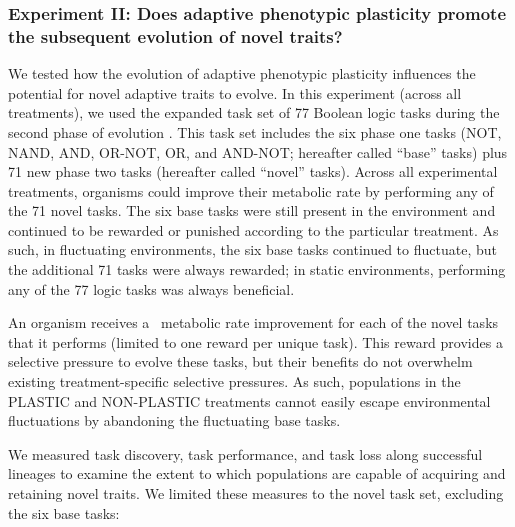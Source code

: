 \vspace{0.5cm}
\subsubsection{Experiment II: Does adaptive phenotypic plasticity promote the subsequent evolution of novel traits?}
\label{sec:methods:experiment-novel-traits}

We tested how the evolution of adaptive phenotypic plasticity influences the potential for novel adaptive traits to evolve.
In this experiment (across all treatments), we used the expanded task set of 77 Boolean logic tasks during the second phase of evolution \citep{ofria_avida:_2009}.
This task set includes the six phase one tasks (NOT, NAND, AND, OR-NOT, OR, and AND-NOT; hereafter called ``base'' tasks) plus 71 new phase two tasks (hereafter called ``novel'' tasks).
Across all experimental treatments, organisms could improve their metabolic rate by performing any of the 71 novel tasks.
The six base tasks were still present in the environment and continued to be rewarded or punished according to the particular treatment.
As such, in fluctuating environments, the six base tasks continued to fluctuate, but the additional 71 tasks were always rewarded; in static environments, performing any of the 77 logic tasks was always beneficial.

An organism receives a \novelTraitsReward\ metabolic rate improvement for each of the novel tasks that it performs (limited to one reward per unique task).
This reward provides a selective pressure to evolve these tasks, but their benefits do not overwhelm existing treatment-specific selective pressures.
As such, populations in the PLASTIC and NON-PLASTIC treatments cannot easily escape environmental fluctuations by abandoning the fluctuating base tasks.

We measured task discovery, task performance, and task loss along successful lineages to examine the extent to which populations are capable of acquiring and retaining novel traits. %
We limited these measures to the novel task set, excluding the six base tasks:

